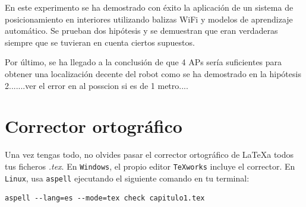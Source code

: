 En este experimento se ha demostrado con éxito la aplicación de un sistema de posicionamiento en interiores utilizando balizas WiFi y modelos de aprendizaje automático. Se prueban dos hipótesis y se demuestran que eran verdaderas siempre que se tuvieran en cuenta ciertos supuestos.

Por último, se ha llegado a la conclusión de que 4 APs sería suficientes para obtener una localización decente del robot como se ha demostrado en la hipótesis 2.......ver el error en al posscion si es de 1 metro....




\section{Corrector ortográfico}

Una vez tengas todo, no olvides pasar el corrector ortográfico de \LaTeX a todos tus ficheros \textit{.tex}. En \texttt{Windows}, el propio editor \texttt{TeXworks} incluye el corrector. En \texttt{Linux}, usa \texttt{aspell} ejecutando el siguiente comando en tu terminal:

\begin{verbatim}
aspell --lang=es --mode=tex check capitulo1.tex
\end{verbatim}

